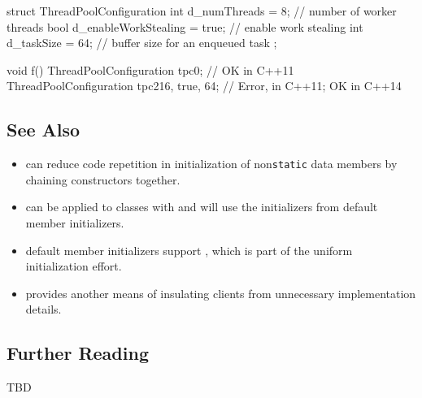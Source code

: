 \begin{emcppslisting}
struct ThreadPoolConfiguration
{
    int  d_numThreads         = 8;     // number of worker threads
    bool d_enableWorkStealing = true;  // enable work stealing
    int  d_taskSize           = 64;    // buffer size for an enqueued task
};

void f()
{
    ThreadPoolConfiguration tpc0;               // OK in C++11
    ThreadPoolConfiguration tpc2{16, true, 64}; // Error, in C++11; OK in C++14
}
\end{emcppslisting}
    

\subsection[See Also]{See Also}\label{see-also}

\begin{itemize}
\item{can reduce code repetition in initialization of non\lstinline!static! data members by chaining constructors together.}
\item{can be applied to classes with and will use the initializers from default member initializers.}
\item{default member initializers support , which is part of the uniform initialization effort.}
\item{provides another means of insulating clients from unnecessary implementation details.}
\end{itemize}

\subsection[Further Reading]{Further Reading}

TBD
